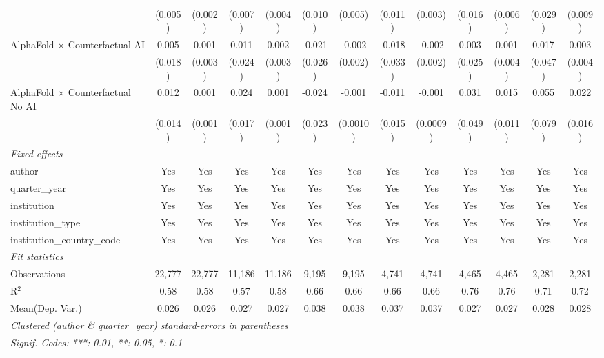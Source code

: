\begin{tabular}{lcccccccccccc}
                                            & (0.005) & (0.002)      & (0.007) & (0.004) & (0.010)     & (0.005)     & (0.011) & (0.003)  & (0.016) & (0.006) & (0.029) & (0.009)\\   
   AlphaFold $\times$ Counterfactual AI     & 0.005   & 0.001        & 0.011   & 0.002   & -0.021      & -0.002      & -0.018  & -0.002   & 0.003   & 0.001   & 0.017   & 0.003\\   
                                            & (0.018) & (0.003)      & (0.024) & (0.003) & (0.026)     & (0.002)     & (0.033) & (0.002)  & (0.025) & (0.004) & (0.047) & (0.004)\\   
   AlphaFold $\times$ Counterfactual No AI  & 0.012   & 0.001        & 0.024   & 0.001   & -0.024      & -0.001      & -0.011  & -0.001   & 0.031   & 0.015   & 0.055   & 0.022\\   
                                            & (0.014) & (0.001)      & (0.017) & (0.001) & (0.023)     & (0.0010)    & (0.015) & (0.0009) & (0.049) & (0.011) & (0.079) & (0.016)\\   
   \midrule
   \emph{Fixed-effects}\\
   author                                   & Yes     & Yes          & Yes     & Yes     & Yes         & Yes         & Yes     & Yes      & Yes     & Yes     & Yes     & Yes\\  
   quarter\_year                            & Yes     & Yes          & Yes     & Yes     & Yes         & Yes         & Yes     & Yes      & Yes     & Yes     & Yes     & Yes\\  
   institution                              & Yes     & Yes          & Yes     & Yes     & Yes         & Yes         & Yes     & Yes      & Yes     & Yes     & Yes     & Yes\\  
   institution\_type                        & Yes     & Yes          & Yes     & Yes     & Yes         & Yes         & Yes     & Yes      & Yes     & Yes     & Yes     & Yes\\  
   institution\_country\_code               & Yes     & Yes          & Yes     & Yes     & Yes         & Yes         & Yes     & Yes      & Yes     & Yes     & Yes     & Yes\\  
   \midrule
   \emph{Fit statistics}\\
   Observations                             & 22,777  & 22,777       & 11,186  & 11,186  & 9,195       & 9,195       & 4,741   & 4,741    & 4,465   & 4,465   & 2,281   & 2,281\\  
   R$^2$                                    & 0.58    & 0.58         & 0.57    & 0.58    & 0.66        & 0.66        & 0.66    & 0.66     & 0.76    & 0.76    & 0.71    & 0.72\\  
Mean(Dep. Var.) & 0.026 & 0.026 & 0.027 & 0.027 & 0.038 & 0.038 & 0.037 & 0.037 & 0.027 & 0.027 & 0.028 & 0.028 \\
   \midrule \midrule
   \multicolumn{13}{l}{\emph{Clustered (author \& quarter\_year) standard-errors in parentheses}}\\
   \multicolumn{13}{l}{\emph{Signif. Codes: ***: 0.01, **: 0.05, *: 0.1}}\\
\end{tabular}
\par\endgroup
